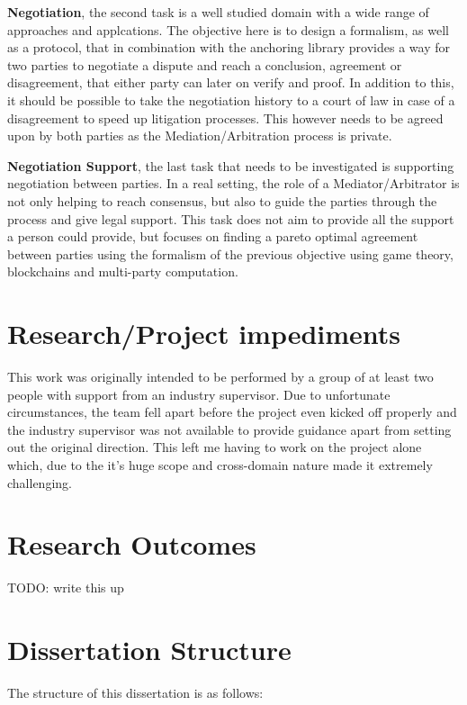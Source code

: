 \documentclass[12pt,msc,a4paper,oneside]{ucl_thesis}
\begin{document}
\textbf{Negotiation}, the second task is a well studied domain with a wide range of approaches and applcations. The objective here is to design a formalism, as well as a protocol, that in combination with the anchoring library provides a way for two parties to negotiate a dispute and reach a conclusion, agreement or disagreement, that either party can later on verify and proof. In addition to this, it should be possible to take the negotiation history to a court of law in case of a disagreement to speed up litigation processes. This however needs to be agreed upon by both parties as the Mediation/Arbitration process is private.

\textbf{Negotiation Support}, the last task that needs to be investigated is supporting negotiation between parties. In a real setting, the role of a Mediator/Arbitrator is not only helping to reach consensus, but also to guide the parties through the process and give legal support. This task does not aim to provide all the support a person could provide, but focuses on finding a pareto optimal agreement between parties using the formalism of the previous objective using game theory, blockchains and multi-party computation.

\section{Research/Project impediments}
This work was originally intended to be performed by a group of at least two people with support from an industry supervisor. Due to unfortunate circumstances, the team fell apart before the project even kicked off properly and the industry supervisor was not available to provide guidance apart from setting out the original direction. This left me having to work on the project alone which, due to the it's huge scope and cross-domain nature made it extremely challenging.

\section{Research Outcomes}
TODO: write this up

\section{Dissertation Structure}
The structure of this dissertation is as follows:
\end{document}
